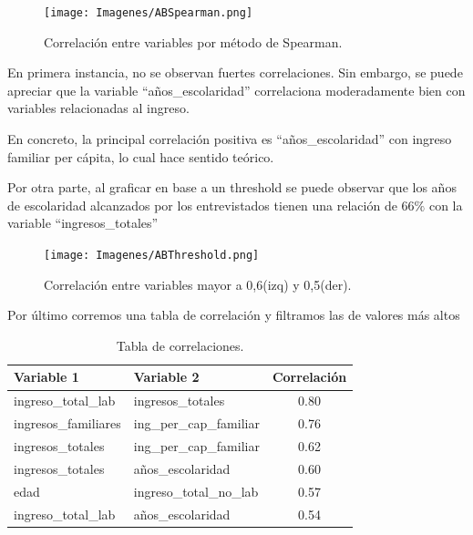 \documentclass[a4paper]{article}
\begin{document}
        \begin{figure}[H]
                \centering
            \texttt{[image: Imagenes/ABSpearman.png]}
            \caption{Correlación entre variables por método de Spearman.}
            \label{AB Spearman Correlation}
        \end{figure}
 
        En primera instancia, no se observan fuertes correlaciones. Sin embargo, se puede apreciar que la variable ``años\_escolaridad'' correlaciona moderadamente bien con variables relacionadas al ingreso.
 
        En concreto, la principal correlación positiva es ``años\_escolaridad'' con ingreso familiar per cápita, lo cual hace sentido teórico.
        
        Por otra parte, al graficar en base a un threshold se puede observar que los años de escolaridad alcanzados por los entrevistados tienen una relación de $66\%$ con la variable ``ingresos\_totales''

        \begin{figure}[H]
            \centering
            \texttt{[image: Imagenes/ABThreshold.png]}
            \caption{Correlación entre variables mayor a 0,6(izq) y 0,5(der).}
            \label{AB Treshold Correlation}
        \end{figure}
 
        Por último corremos una tabla de correlación y filtramos las de valores más altos
 
        \begin{table}[H]
            \centering
            \begin{tabular}{llc}
                \toprule
                Variable 1 & Variable 2 & Correlación \\ \midrule
                ingreso\_total\_lab & ingresos\_totales & 0.80 \\        
                ingresos\_familiares & ing\_per\_cap\_familiar & 0.76 \\ 
                ingresos\_totales & ing\_per\_cap\_familiar & 0.62 \\    
                ingresos\_totales & años\_escolaridad & 0.60 \\          
                edad & ingreso\_total\_no\_lab & 0.57 \\                 
                ingreso\_total\_lab & años\_escolaridad & 0.54 \\
                \bottomrule
            \end{tabular}
            \caption{Tabla de correlaciones.}
            \label{AB Correlation Table}
        \end{table}
 
\end{document}
